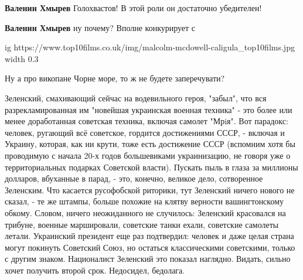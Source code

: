 \begin{itemize}
\begin{itemize}
 
\textbf{Валенин Хмырев} Голохвастов! В этой роли он достаточно убедителен!

 
\textbf{Валенин Хмырев} ну почему? Вполне конкурирует с

\ifcmt
  ig https://www.top10films.co.uk/img/malcolm-mcdowell-caligula_top10films.jpg
  width 0.3
\fi
\end{itemize}

 
Ну а про викопане Чорне море, то ж не будете заперечувати?

 

Зеленский, смахивающий сейчас на водевильного героя, "забыл", что вся
разрекламированная им "новейшая украинская военная техника" - это более или
менее доработанная советская техника, включая самолет "Мрiя". Вот парадокс:
человек, ругающий всё советское, гордится достижениями СССР, - включая и
Украину, которая, как ни крути, тоже есть достижение СССР (вспомним хотя бы
проводимую с начала 20-х годов большевиками украинизацию, не говоря уже о
территориальных подарках Советской власти). Пускать пыль в глаза за миллионы
долларов, вбуханные в парад, - это, конечно, великое дело, сотворенное
Зеленским. Что касается русофобской риторики, тут Зеленский ничего нового не
сказал, - те же штампы, больше похожие на клятву верности вашингтонскому
обкому. Словом, ничего неожиданного не случилось: Зеленский красовался на
трибуне, военные маршировали, советские танки ехали, советские самолеты летали.
Украинский президент еще раз подтвердил: человек и даже целая страна могут
покинуть Советский Союз, но остаться классическими советскими, только с другим
знаком. Националист Зеленский это показал наглядно. Видать, сильно хочет
получить второй срок. Недосидел, бедолага.


\end{itemize}

